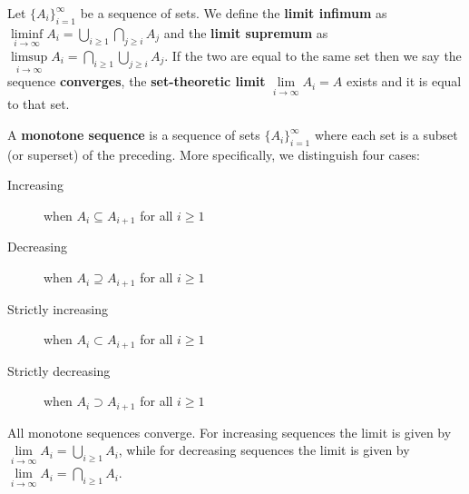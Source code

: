 \documentclass{bareminimum}
\begin{document}
\begin{defn}
	Let $\{A_i\}_{i=1}^{\infty}$  be a sequence of sets. We define the \textbf{limit infimum} as $\liminf\limits_{i \to \infty} A_i = \bigcup\limits_{i \geq 1}\bigcap\limits_{j \geq i} A_j$ and the \textbf{limit supremum} as $\limsup\limits_{i \to \infty} A_i = \bigcap\limits_{i \geq 1}\bigcup\limits_{j \geq i} A_j$. If the two are equal to the same set then we say the sequence \textbf{converges}, the \textbf{set-theoretic limit} $\lim\limits_{i \to \infty} A_i = A$ exists and it is equal to that set.
\end{defn}

\begin{defn}
	A \textbf{monotone sequence}  is a sequence of sets $\{A_i\}_{i=1}^{\infty}$ where each set is a subset (or superset) of the preceding. More specifically, we distinguish four cases:
	\begin{description}
		\item[Increasing] when $A_i \subseteq A_{i+1}$ for all $i \geq 1$
		\item[Decreasing] when $A_i \supseteq A_{i+1}$ for all $i \geq 1$
		\item[Strictly increasing] when $A_i \subset A_{i+1}$ for all $i \geq 1$
		\item[Strictly decreasing] when $A_i \supset A_{i+1}$ for all $i \geq 1$
	\end{description}
\end{defn}

\begin{prop}
	All monotone  sequences converge. For increasing sequences the limit is given by $\lim\limits_{i \to \infty} A_i = \bigcup\limits_{i \geq 1} A_i$, while for decreasing sequences  the limit is given by $\lim\limits_{i \to \infty} A_i = \bigcap\limits_{i \geq 1} A_i$.
\end{prop}
\end{document}
